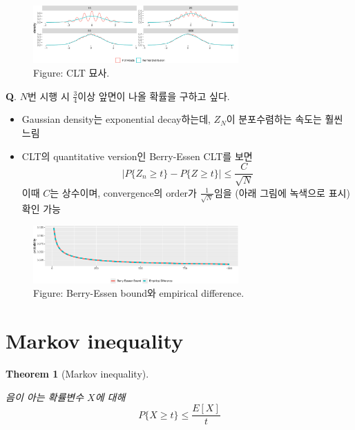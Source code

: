 \documentclass[
  13pt,
  letterpaper,
  DIV=11,
  numbers=noendperiod]{scrreprt}
\theoremstyle{plain}
\theoremstyle{definition}
\theoremstyle{definition}
\theoremstyle{plain}
\theoremstyle{definition}
\theoremstyle{plain}
\newtheorem{theorem}{Theorem}[chapter]
\theoremstyle{remark}
\begin{document}
\begin{figure}[th]

{\centering \includegraphics[width=0.7\textwidth,height=\textheight]{ineq_files/figure-pdf/unnamed-chunk-2-1.pdf}

}

\caption{Figure: CLT 묘사.}

\end{figure}%

\textbf{Q}. \(N\)번 시행 시 \(\frac{3}{4}\)이상 앞면이 나올 확률을
구하고 싶다.

\begin{itemize}
\item
  Gaussian density는 exponential decay하는데, \(Z_N\)이 분포수렴하는
  속도는 훨씬 느림
\item
  CLT의 quantitative version인 Berry-Essen CLT를 보면 \[
  |P\{Z_n \geq t\} - P\{Z \geq t\} | \leq \frac{C}{\sqrt{N}}
  \] 이때 \(C\)는 상수이며, convergence의 order가
  \(\frac{1}{\sqrt{N}}\)임을 (아래 그림에 녹색으로 표시) 확인 가능
\end{itemize}

\begin{figure}[th]

{\centering \includegraphics[width=0.7\textwidth,height=\textheight]{ineq_files/figure-pdf/unnamed-chunk-3-1.pdf}

}

\caption{Figure: Berry-Essen bound와 empirical difference.}

\end{figure}%

\section{Markov inequality}\label{markov-inequality}

\begin{theorem}[Markov
inequality]\protect\hypertarget{thm-markovineq}{}\label{thm-markovineq}

음이 아는 확률변수 \(X\)에 대해 \[
P\{ X\geq t\} \leq \frac{E[X]}{t}
\]

\end{theorem}
\end{document}

